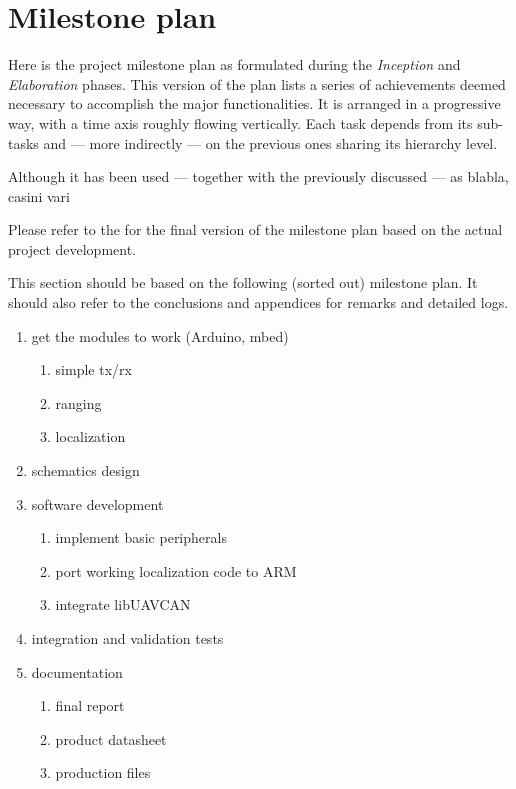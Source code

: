 \section{Milestone plan}

Here is the project milestone plan as formulated during the \emph{Inception} and \emph{Elaboration} phases.
This version of the plan lists a series of achievements deemed necessary to accomplish the major functionalities.
It is arranged in a progressive way, with a time axis roughly flowing vertically.
Each task depends from its sub-tasks and --- more indirectly --- on the previous ones sharing its hierarchy level.

Although it has been used --- together with the previously discussed  --- as blabla, casini vari

Please refer to the  for the final version of the milestone plan based on the actual project development.


This section should be based on the following (sorted out) milestone plan. It should also refer to the conclusions and appendices for remarks and detailed logs.

\begin{enumerate}
\item get the modules to work (Arduino, mbed)
	\begin{enumerate}
	\item simple tx/rx
	\item ranging
	\item localization
	\end{enumerate}
\item schematics design
\item software development
	\begin{enumerate}
	\item implement basic peripherals
	\item port working localization code to ARM
	\item integrate libUAVCAN
	\end{enumerate}
\item integration and validation tests
\item documentation
	\begin{enumerate}
	\item final report
	\item product datasheet
	\item production files
	\end{enumerate}
\end{enumerate}
